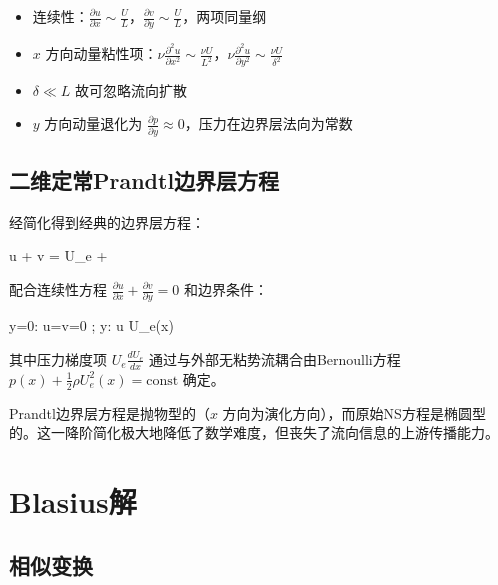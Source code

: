 \begin{itemize}
    \item 连续性：$\frac{\partial u}{\partial x} \sim \frac{U}{L}$，$\frac{\partial v}{\partial y} \sim \frac{U}{L}$，两项同量纲
    \item $x$ 方向动量粘性项：$\nu\frac{\partial^{2}u}{\partial x^{2}} \sim \frac{\nu U}{L^{2}}$，$\nu\frac{\partial^{2}u}{\partial y^{2}} \sim \frac{\nu U}{\delta^{2}}$
    \item $\delta \ll L$ 故可忽略流向扩散
    \item $y$ 方向动量退化为 $\frac{\partial p}{\partial y} \approx 0$，压力在边界层法向为常数
\end{itemize}

\subsection{二维定常Prandtl边界层方程}

经简化得到经典的边界层方程：

\begin{myformula}
    u + v = U_e + \nu{}
\end{myformula}

配合连续性方程 $\frac{\partial u}{\partial x} + \frac{\partial v}{\partial y} = 0$ 和边界条件：

\begin{myformula}
    y=0:\; u=v=0 \quad{};\qquad
    y\to\infty:\; u \to U_e(x) \quad{}
\end{myformula}

其中压力梯度项 $U_e\frac{dU_e}{dx}$ 通过与外部无粘势流耦合由Bernoulli方程 $p(x) + \frac{1}{2}\rho U_e^{2}(x) = \mathrm{const}$ 确定。

\begin{remark}
Prandtl边界层方程是抛物型的（$x$ 方向为演化方向），而原始NS方程是椭圆型的。这一降阶简化极大地降低了数学难度，但丧失了流向信息的上游传播能力。
\end{remark}

\section{Blasius解}

\subsection{相似变换}

